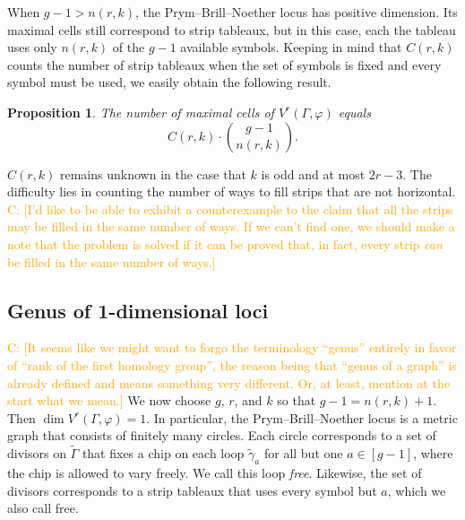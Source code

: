 \documentclass[11pt,reqno]{amsart}
\newcommand*{\ti}[1]{\tilde{#1}}
\newcommand*{\wti}[1]{\widetilde{#1}}
\newcommand{\caelan}[1]{\textcolor{orange}{\sf C: [#1]}}
\theoremstyle{definition}
\theoremstyle{problem}
\theoremstyle{plain}
\newtheorem{proposition}[definition]{Proposition}
\theoremstyle{remark}
\theoremstyle{theorem}
\numberwithin{equation}{section}
\numberwithin{figure}{section}
\begin{document}
When $g-1 > n(r,k)$, the Prym--Brill--Noether locus has positive
dimension.  Its maximal cells  still correspond to strip tableaux,
but in this case, each the tableau uses only $n(r,k)$ of the $g - 1$
available symbols.  Keeping in mind that $C(r,k)$ counts the number of
strip tableaux when the set of symbols is fixed and every symbol must
be used, we easily obtain the following result.


\begin{proposition}
  \label{prop:numcomp}
  The number of maximal cells of $V^r(\Gamma,\varphi)$ equals
  \begin{equation*}
    C(r,k) \cdot \binom{g-1}{n(r,k)}.
  \end{equation*}
\end{proposition}

$C(r,k)$ remains unknown in the case that $k$ is odd and at most
$2r-3$.  The difficulty lies in counting the number of ways to fill
strips that are not horizontal.  \caelan{I'd like to be able to
  exhibit a counterexample to the claim that all the strips may be
  filled in the same number of ways.  If we can't find one, we should
  make a note that the problem is solved if it can be proved that, in
  fact, every strip \textit{can} be filled in the same number of
  ways.}

\subsection{Genus of 1-dimensional loci}
\caelan{It seems like we might want to forgo the terminology ``genus''
  entirely in favor of ``rank of the first homology group'', the
  reason being that ``genus of a graph'' is already defined and means
  something very different.  Or, at least, mention at the start what
  we mean.}  We now choose $g$, $r$, and $k$ so that $g-1=n(r,k)+1$.
Then $\dim V^r(\Gamma,\varphi) = 1$.  In particular, the
Prym--Brill--Noether locus is a metric graph that consists of finitely many
circles. Each circle corresponds to  a set of divisors on $\wti\Gamma$
that fixes a chip on each loop $\ti\gamma_a$ for all but one
$a \in [g-1]$, where the chip is allowed to vary freely.  We call this
loop \textit{free}.  Likewise, the set of divisors corresponds to a
strip tableaux that uses every symbol but $a$, which we also call
free.
\end{document}
